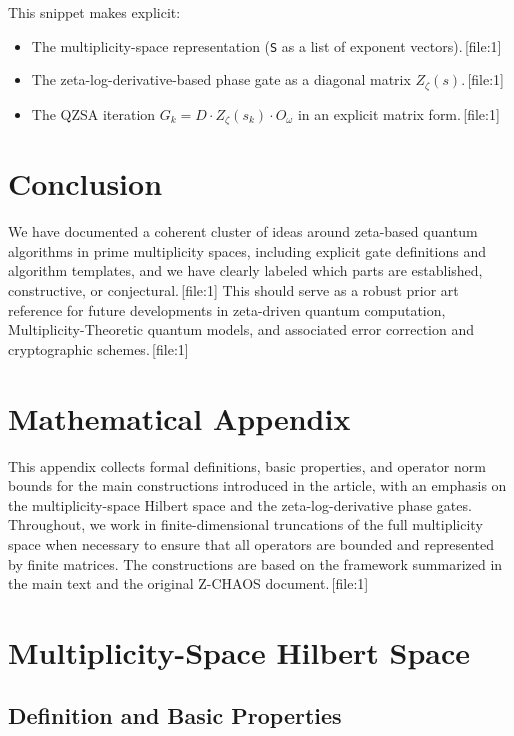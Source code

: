 \documentclass[11pt]{article}
\begin{document}
This snippet makes explicit:

\begin{itemize}[leftmargin=*]
    \item The multiplicity-space representation (\texttt{S} as a list of exponent vectors).\,[file:1]
    \item The zeta-log-derivative-based phase gate as a diagonal matrix \(Z_\zeta(s)\).\,[file:1]
    \item The QZSA iteration \(G_k = D \cdot Z_\zeta(s_k) \cdot O_\omega\) in an explicit matrix form.\,[file:1]
\end{itemize}

\section{Conclusion}

We have documented a coherent cluster of ideas around zeta-based quantum algorithms in prime multiplicity spaces, including explicit gate definitions and algorithm templates, and we have clearly labeled which parts are established, constructive, or conjectural.\,[file:1] This should serve as a robust prior art reference for future developments in zeta-driven quantum computation, Multiplicity-Theoretic quantum models, and associated error correction and cryptographic schemes.\,[file:1]

\appendix
\section*{Mathematical Appendix}

\renewcommand{\thesection}{A.\arabic{section}}
\setcounter{section}{0}

This appendix collects formal definitions, basic properties, and operator norm bounds for the main constructions introduced in the article, with an emphasis on the multiplicity-space Hilbert space and the zeta-log-derivative phase gates. Throughout, we work in finite-dimensional truncations of the full multiplicity space when necessary to ensure that all operators are bounded and represented by finite matrices. The constructions are based on the framework summarized in the main text and the original Z-CHAOS document.\,[file:1]

\section{Multiplicity-Space Hilbert Space}

\subsection{Definition and Basic Properties}
\end{document}
